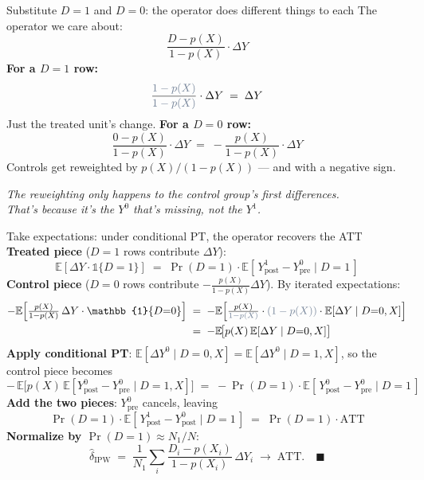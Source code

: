 \documentclass[aspectratio=169,11pt]{beamer}
\begin{document}
\begin{frame}{Substitute $D{=}1$ and $D{=}0$: the operator does different things to each}
\vspace{0.4em}
The operator we care about:
\[
\frac{D - p(X)}{1 - p(X)} \cdot \Delta Y
\]
\vspace{0.4em}
\textbf{For a $D{=}1$ row:}
\[
\frac{\textcolor{warmgray}{1 - p(X)}}{\textcolor{warmgray}{1 - p(X)}} \cdot \Delta Y \;=\; \Delta Y
\]
Just the treated unit's change. \;
\vspace{0.4em}
\textbf{For a $D{=}0$ row:}
\[
\frac{0 - p(X)}{1 - p(X)} \cdot \Delta Y \;=\; -\frac{p(X)}{1 - p(X)} \cdot \Delta Y
\]
Controls get reweighted by $p(X)/(1-p(X))$ \;--- and with a negative sign.
\vspace{0.4em}
\begin{center}
\small\color{warmgray}\itshape
The reweighting only happens to the control group's first differences. \\[0.1em]
That's because it's the $Y^0$ that's missing, not the $Y^1$.
\end{center}
\end{frame}

\begin{frame}{Take expectations: under conditional PT, the operator recovers the ATT}
\vspace{0.3em}
\footnotesize
\textbf{Treated piece} ($D=1$ rows contribute $\Delta Y$):
\vspace{-0.2em}
\[
\mathbb{E}[\Delta Y \cdot \mathbb{1}\{D{=}1\}] \;=\; \Pr(D{=}1) \cdot \mathbb{E}[\,Y^1_{\text{post}} - Y^0_{\text{pre}} \mid D{=}1\,]
\]
\textbf{Control piece} ($D=0$ rows contribute $-\frac{p(X)}{1-p(X)}\Delta Y$). \;By iterated expectations:
\vspace{-0.2em}
\begin{align*}
-\mathbb{E}\!\left[\tfrac{p(X)}{1-p(X)}\,\Delta Y \cdot \mathbb{1}\{D{=}0\}\right]
&\;=\; -\mathbb{E}\!\left[\tfrac{p(X)}{\textcolor{warmgray}{1-p(X)}} \cdot \textcolor{warmgray}{(1-p(X))} \cdot \mathbb{E}[\Delta Y \mid D{=}0, X]\right] \\
&\;=\; -\mathbb{E}\!\big[p(X)\,\mathbb{E}[\Delta Y \mid D{=}0, X]\big]
\end{align*}
\textbf{Apply conditional PT}: \;$\mathbb{E}[\Delta Y^0 \mid D{=}0, X] = \mathbb{E}[\Delta Y^0 \mid D{=}1, X]$, so the control piece becomes
\vspace{-0.2em}
\[
-\,\mathbb{E}\!\big[p(X)\,\mathbb{E}[Y^0_{\text{post}} - Y^0_{\text{pre}} \mid D{=}1, X]\big]
\;=\; -\Pr(D{=}1) \cdot \mathbb{E}[\,Y^0_{\text{post}} - Y^0_{\text{pre}} \mid D{=}1\,]
\]
\textbf{Add the two pieces}: $Y^0_{\text{pre}}$ cancels, leaving
\vspace{-0.2em}
\[
\Pr(D{=}1) \cdot \mathbb{E}[\,Y^1_{\text{post}} - Y^0_{\text{post}} \mid D{=}1\,]
\;=\; \Pr(D{=}1) \cdot \text{ATT}
\]
\textbf{Normalize by $\Pr(D{=}1) \approx N_1/N$}:
\[
\widehat\delta_{\text{IPW}} \;=\; \frac{1}{N_1}\sum_i \frac{D_i - p(X_i)}{1-p(X_i)}\,\Delta Y_i \;\to\; \text{ATT}. \quad\blacksquare
\]
\end{frame}
\end{document}
